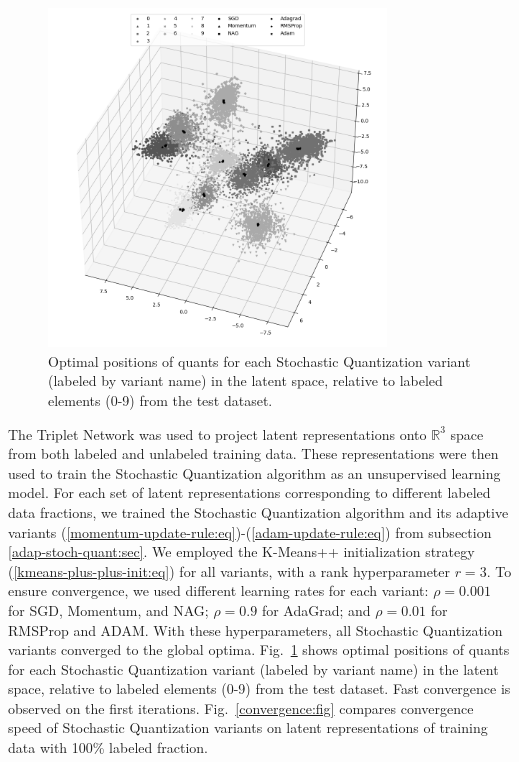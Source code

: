 \begin{figure}
    \centering
    \includegraphics[width=0.8\textwidth]{figures/sq_quants.png}
    \caption{Optimal positions of quants for each Stochastic Quantization variant (labeled by variant name) in the latent space, relative to labeled elements (0-9) from the test dataset.}
    \label{quants:fig}
\end{figure}

The Triplet Network was used to project latent representations onto $\mathbb{R}^3$ space from both labeled and unlabeled training data. These representations were then used to train the Stochastic Quantization algorithm as an unsupervised learning model. For each set of latent representations corresponding to different labeled data fractions, we trained the Stochastic Quantization algorithm and its adaptive variants (\ref{momentum-update-rule:eq})-(\ref{adam-update-rule:eq}) from subsection \ref{adap-stoch-quant:sec}. We employed the K-Means++ initialization strategy (\ref{kmeans-plus-plus-init:eq}) for all variants, with a rank hyperparameter $r = 3$. To ensure convergence, we used different learning rates for each variant: $\rho = 0.001$ for SGD, Momentum, and NAG; $\rho = 0.9$ for AdaGrad; and $\rho = 0.01$ for RMSProp and ADAM. With these hyperparameters, all Stochastic Quantization variants converged to the global optima. Fig.~\ref{quants:fig} shows optimal positions of quants for each Stochastic Quantization variant (labeled by variant name) in the latent space, relative to labeled elements (0-9) from the test dataset. Fast convergence is observed on the first iterations. Fig.~\ref{convergence:fig} compares convergence speed of Stochastic Quantization variants on latent representations of training data with 100\% labeled fraction.

